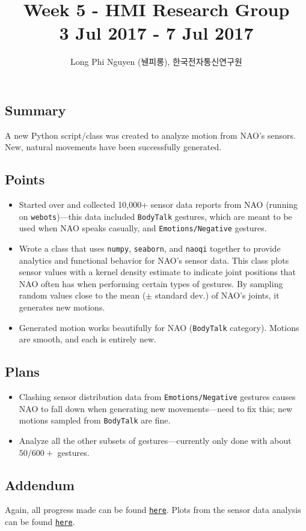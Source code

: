 \documentclass{article}
\title{Week 5 - HMI Research Group \\ \large 3 Jul 2017 - 7 Jul 2017}
\author{Long Phi Nguyen (뉀피롱), 한국전자통신연구원}
\begin{document}
  \maketitle


  \subsection*{Summary} A new Python script/class was created to analyze motion from NAO's sensors. New, natural movements
  have been successfully generated.

  \subsection*{Points}
  \begin{itemize}
    \item Started over and collected 10,000+ sensor data reports from NAO (running on \verb|webots|)---this data
    included \verb|BodyTalk| gestures, which are meant to be used when NAO speaks casually, and \verb|Emotions/Negative|
    gestures.
    \item Wrote a class that uses \verb|numpy|, \verb|seaborn|, and \verb|naoqi| together to provide analytics and
    functional behavior for NAO's sensor data. This class plots sensor values with a kernel density estimate to indicate
    joint positions that NAO often has when performing certain types of gestures. By sampling random values close to the
    mean ($\pm$ standard dev.) of NAO's joints, it generates new motions.
    \item Generated motion works beautifully for NAO (\verb|BodyTalk| category). Motions are smooth, and each is entirely new.
  \end{itemize}

  \subsection*{Plans}
  \begin{itemize}
    \item Clashing sensor distribution data from \verb|Emotions/Negative| gestures causes NAO to fall down when
    generating new movements---need to fix this; new motions sampled from \verb|BodyTalk| are fine.
    \item Analyze all the other subsets of gestures---currently only done with about $50/600+$ gestures.
  \end{itemize}

  \subsection*{Addendum}
  Again, all progress made can be found \href{https://github.com/longnguyen1997/nao_animations}{\texttt{here}}.
  Plots from the sensor data analysis can be found \href{https://github.com/longnguyen1997/nao_animations/tree/master/plots}{\texttt{here}}.
\end{document}
